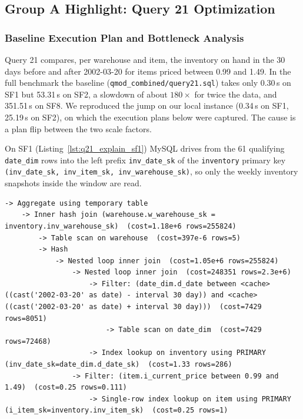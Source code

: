 \documentclass{ULBreport}
\begin{document}
\subsection{Group A Highlight: Query 21 Optimization}

\subsubsection{Baseline Execution Plan and Bottleneck Analysis}
Query 21 compares, per warehouse and item, the inventory on hand in the 30 days before and after 2002-03-20 for items priced between 0.99 and 1.49. In the full benchmark the baseline (\texttt{qmod\_combined/query21.sql}) takes only 0.30\,s on SF1 but 53.31\,s on SF2, a slowdown of about $180\times$ for twice the data, and 351.51\,s on SF8. We reproduced the jump on our local instance (0.34\,s on SF1, 25.19\,s on SF2), on which the execution plans below were captured. The cause is a plan flip between the two scale factors.

On SF1 (Listing~\ref{lst:q21_explain_sf1}) MySQL drives from the 61 qualifying \texttt{date\_dim} rows into the left prefix \texttt{inv\_date\_sk} of the \texttt{inventory} primary key \texttt{(inv\_date\_sk, inv\_item\_sk, inv\_warehouse\_sk)}, so only the weekly inventory snapshots inside the window are read.

\begin{lstlisting}[caption={Baseline \texttt{EXPLAIN FORMAT=TREE} on SF1 for Query 21 (top of plan omitted)}, label={lst:q21_explain_sf1}, basicstyle=\ttfamily\scriptsize, breaklines=true, frame=single]
-> Aggregate using temporary table
    -> Inner hash join (warehouse.w_warehouse_sk = inventory.inv_warehouse_sk)  (cost=1.18e+6 rows=255824)
        -> Table scan on warehouse  (cost=397e-6 rows=5)
        -> Hash
            -> Nested loop inner join  (cost=1.05e+6 rows=255824)
                -> Nested loop inner join  (cost=248351 rows=2.3e+6)
                    -> Filter: (date_dim.d_date between <cache>((cast('2002-03-20' as date) - interval 30 day)) and <cache>((cast('2002-03-20' as date) + interval 30 day)))  (cost=7429 rows=8051)
                        -> Table scan on date_dim  (cost=7429 rows=72468)
                    -> Index lookup on inventory using PRIMARY (inv_date_sk=date_dim.d_date_sk)  (cost=1.33 rows=286)
                -> Filter: (item.i_current_price between 0.99 and 1.49)  (cost=0.25 rows=0.111)
                    -> Single-row index lookup on item using PRIMARY (i_item_sk=inventory.inv_item_sk)  (cost=0.25 rows=1)
\end{lstlisting}
\end{document}
